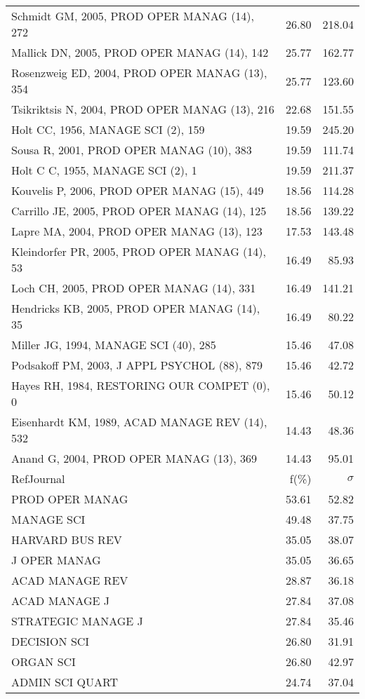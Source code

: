 \documentclass[a4paper,11pt]{report}
\begin{document}
\begin{landscape}
\begin{table}[!ht]
{\begin{tabular}{|l r r|}
Schmidt GM, 2005, PROD OPER MANAG (14), 272 & 26.80 & 218.04\\
Mallick DN, 2005, PROD OPER MANAG (14), 142 & 25.77 & 162.77\\
Rosenzweig ED, 2004, PROD OPER MANAG (13), 354 & 25.77 & 123.60\\
Tsikriktsis N, 2004, PROD OPER MANAG (13), 216 & 22.68 & 151.55\\
Holt CC, 1956, MANAGE SCI (2), 159 & 19.59 & 245.20\\
Sousa R, 2001, PROD OPER MANAG (10), 383 & 19.59 & 111.74\\
Holt C C, 1955, MANAGE SCI (2), 1 & 19.59 & 211.37\\
Kouvelis P, 2006, PROD OPER MANAG (15), 449 & 18.56 & 114.28\\
Carrillo JE, 2005, PROD OPER MANAG (14), 125 & 18.56 & 139.22\\
Lapre MA, 2004, PROD OPER MANAG (13), 123 & 17.53 & 143.48\\
Kleindorfer PR, 2005, PROD OPER MANAG (14), 53 & 16.49 & 85.93\\
Loch CH, 2005, PROD OPER MANAG (14), 331 & 16.49 & 141.21\\
Hendricks KB, 2005, PROD OPER MANAG (14), 35 & 16.49 & 80.22\\
Miller JG, 1994, MANAGE SCI (40), 285 & 15.46 & 47.08\\
Podsakoff PM, 2003, J APPL PSYCHOL (88), 879 & 15.46 & 42.72\\
Hayes RH, 1984, RESTORING OUR COMPET (0), 0 & 15.46 & 50.12\\
Eisenhardt KM, 1989, ACAD MANAGE REV (14), 532 & 14.43 & 48.36\\
Anand G, 2004, PROD OPER MANAG (13), 369 & 14.43 & 95.01\\
\hline
\hline
RefJournal & f(\%) & $\sigma$\\
\hline
PROD OPER MANAG & 53.61 & 52.82\\
MANAGE SCI & 49.48 & 37.75\\
HARVARD BUS REV & 35.05 & 38.07\\
J OPER MANAG & 35.05 & 36.65\\
ACAD MANAGE REV & 28.87 & 36.18\\
ACAD MANAGE J & 27.84 & 37.08\\
STRATEGIC MANAGE J & 27.84 & 35.46\\
DECISION SCI & 26.80 & 31.91\\
ORGAN SCI & 26.80 & 42.97\\
ADMIN SCI QUART & 24.74 & 37.04\\
\hline
\end{tabular}
}
\end{table}


\end{landscape}
\end{document}
